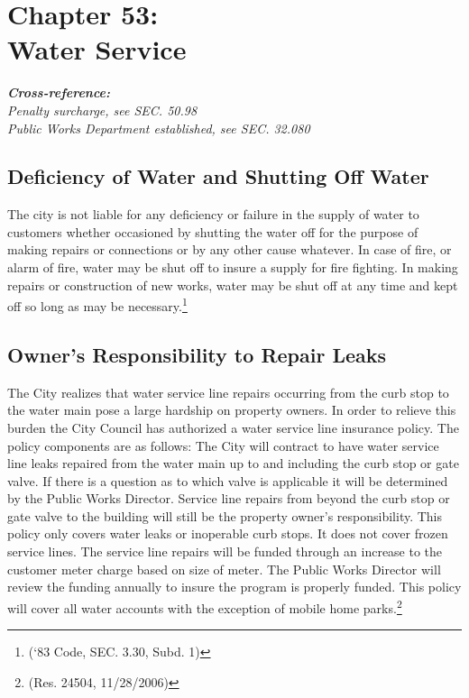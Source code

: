 \chapter*{Chapter 53: \\
	Water Service}
    \vfill
    \minitoc
    \textbf{\emph{{Cross-reference:}}}\\
    \indent\emph{Penalty surcharge, see SEC. 50.98}\\
    \indent\emph{Public Works Department established, see SEC. 32.080}
    \pagebreak

\section{Deficiency of Water and Shutting Off Water}
The city is not liable for any deficiency or failure in the supply of water to customers whether occasioned by shutting the water off for the purpose of making repairs or connections or by any other cause whatever.  In case of fire, or alarm of fire, water may be shut off to insure a supply for fire fighting.  In making repairs or construction of new works, water may be shut off at any time and kept off so long as may be necessary.\footnote{(‘83 Code, SEC. 3.30, Subd. 1)}

\section{Owner's Responsibility to Repair Leaks}
The City realizes that water service line repairs occurring from the curb stop to the water main pose a large hardship on property owners.  In order to relieve this burden the City Council has authorized a water service line insurance policy.  The policy components are as follows:  The City will contract to have water service line leaks repaired from the water main up to and including the curb stop or gate valve.  If there is a question as to which valve is applicable it will be determined by the Public Works Director. Service line repairs from beyond the curb stop or gate valve to the building will still be the property owner’s responsibility.  This policy only covers water leaks or inoperable curb stops.  It does not cover frozen service lines.  The service line repairs will be funded through an increase to the customer meter charge based on size of meter. The Public Works Director will review the funding annually to insure the program is properly funded.  This policy will cover all water accounts with the exception of mobile home parks.\footnote{(Res. 24504, 11/28/2006)}

